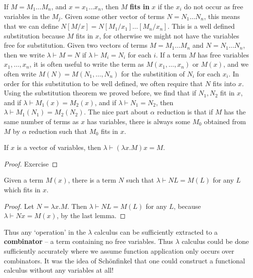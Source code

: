If $M = M_1 \dots M_n$, and $x = x_1 \dots x_n$, then $M$ {\bf fits in} $x$ if the $x_i$ do not occur as free variables in the $M_j$. Given some other vector of terms $N = N_1 \dots N_n$, this means that we can define $N[M/x] = N[M_1/x_1] \dots [M_n/x_n]$. This is a well defined substitution because $M$ fits in $x$, for otherwise we might not have the variables free for substitution. Given two vectors of terms $M = M_1 \dots M_n$ and $N = N_1 \dots N_n$, then we write $\lambda \vdash M = N$ if $\lambda \vdash M_i = N_i$ for each $i$. If a term $M$ has free variables $x_1, \dots, x_n$, it is often useful to write the term as $M(x_1, \dots, x_n)$ or $M(x)$, and we often write $M(N) = M(N_1, \dots, N_n)$ for the substitition of $N_i$ for each $x_i$. In order for this substitution to be well defined, we often require that $N$ fits into $x$. Using the substitution theorem we proved before, we find that if $N_1,N_2$ fit in $x$, and if $\lambda \vdash M_1(x) = M_2(x)$, and if $\lambda \vdash N_1 = N_2$, then $\lambda \vdash M_1(N_1) = M_2(N_2)$. The nice part about $\alpha$ reduction is that if $M$ has the same number of terms as $x$ has variables, there is always some $M_0$ obtained from $M$ by $\alpha$ reduction such that $M_0$ fits in $x$.

\begin{lemma}
    If $x$ is a vector of variables, then $\lambda \vdash (\lambda x.M)x = M$.
\end{lemma}
\begin{proof} Exercise \end{proof}

\begin{theorem}
    Given a term $M(x)$, there is a term $N$ such that $\lambda \vdash NL = M(L)$ for any $L$ which fits in $x$.
\end{theorem}
\begin{proof}
    Let $N = \lambda x.M$. Then $\lambda \vdash NL = M(L)$ for any $L$, because $\lambda \vdash Nx = M(x)$, by the last lemma.
\end{proof}

Thus any `operation' in the $\lambda$ calculus can be sufficiently extracted to a {\bf combinator} -- a term containing no free variables. Thus $\lambda$ calculus could be done sufficiently accurately where we assume function application only occurs over combinators. It was the idea of Sch\"{o}nfinkel that one could construct a functional calculus without any variables at all!